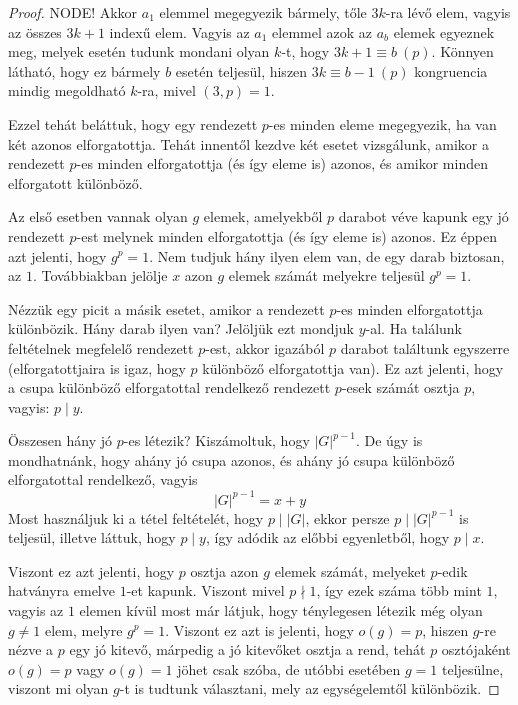 \documentclass[12pt]{book}
\theoremstyle{plain} %
\theoremstyle{definition} %
\theoremstyle{remark}
\numberwithin{equation}{section}  %
\begin{document}
\begin{proof}
		NODE! Akkor $a_1$ elemmel megegyezik bármely, tőle $3k$-ra lévő elem, vagyis az összes $3k+1$ indexű elem. Vagyis az $a_1$ elemmel azok az $a_b$ elemek egyeznek meg, melyek esetén tudunk mondani olyan $k$-t, hogy $3k+1 \equiv b\ (p)$. Könnyen látható, hogy ez bármely $b$ esetén teljesül, hiszen $3k\equiv b-1\ (p)$ kongruencia mindig megoldható $k$-ra, mivel $(3,p) = 1$.
		
		
		Ezzel tehát beláttuk, hogy egy rendezett $p$-es minden eleme megegyezik, ha van két azonos elforgatottja. Tehát innentől kezdve két esetet vizsgálunk, amikor a rendezett $p$-es minden elforgatottja (és így eleme is) azonos, és amikor minden elforgatott különböző.
		
		Az első esetben vannak olyan $g$ elemek, amelyekből $p$ darabot véve kapunk egy jó rendezett $p$-est melynek minden elforgatottja (és így eleme is) azonos. Ez éppen azt jelenti, hogy $g^p = 1$. Nem tudjuk hány ilyen elem van, de egy darab biztosan, az $1$. Továbbiakban jelölje $x$ azon $g$ elemek számát melyekre teljesül $g^p=1$.
		
		Nézzük egy picit a másik esetet, amikor a rendezett $p$-es minden elforgatottja különbözik. Hány darab ilyen van? Jelöljük ezt mondjuk $y$-al. Ha találunk feltételnek megfelelő rendezett $p$-est, akkor igazából  $p$ darabot találtunk egyszerre (elforgatottjaira is igaz, hogy $p$ különböző elforgatottja van). Ez azt jelenti, hogy a csupa különböző elforgatottal rendelkező rendezett $p$-esek számát osztja $p$, vagyis: $p\mid y$.
		
		Összesen hány jó $p$-es létezik? Kiszámoltuk, hogy $|G|^{p-1}$. De úgy is mondhatnánk, hogy ahány jó csupa azonos, és ahány jó csupa különböző elforgatottal rendelkező, vagyis
		\[ |G|^{p-1} = x + y  \]
		Most használjuk ki a tétel feltételét, hogy $p\mid |G|$, ekkor persze $p\mid |G|^{p-1}$ is teljesül, illetve láttuk, hogy $p\mid y$, így adódik az előbbi egyenletből, hogy $p\mid x$.
		
		Viszont ez azt jelenti, hogy $p$ osztja azon $g$ elemek számát, melyeket $p$-edik hatványra emelve $1$-et kapunk. Viszont mivel $p\nmid 1$, így ezek száma több mint $1$, vagyis az $1$ elemen kívül most már látjuk, hogy ténylegesen létezik még olyan $g\neq 1$ elem, melyre $g^p=1$. Viszont ez azt is jelenti, hogy $o(g) = p$, hiszen $g$-re nézve a $p$ egy jó kitevő, márpedig a jó kitevőket osztja a rend, tehát $p$ osztójaként $o(g) = p$ vagy $o(g) = 1$ jöhet csak szóba, de utóbbi esetében $g = 1$ teljesülne, viszont mi olyan $g$-t is tudtunk választani, mely az egységelemtől különbözik.
	\end{proof}
\end{document}
